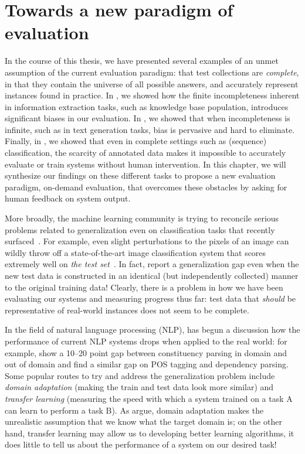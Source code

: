 \chapter[Towards a new paradigm of evaluation]{\label{chap:discussion} Towards a new paradigm of evaluation}

In the course of this thesis, we have presented several examples of an unmet assumption of the current evaluation paradigm: that test collections are \textit{complete}, in that they contain the universe of all possible answers, and accurately represent instances found in practice.
In , we showed how the finite incompleteness inherent in information extraction tasks, such as knowledge base population, introduces significant biases in our evaluation.
In , we showed that when incompleteness is infinite, such as in text generation tasks, bias is pervasive and hard to eliminate.
Finally, in , we showed that even in complete settings such as (sequence) classification, the scarcity of annotated data makes it impossible to accurately evaluate or train systems without human intervention.
In this chapter, we will synthesize our findings on these different tasks to propose a new evaluation paradigm, on-demand evaluation, that overcomes these obstacles by asking for human feedback on system output.

More broadly, the machine learning community is trying to reconcile serious problems related to generalization even on classification tasks that recently surfaced~\citep{}.
For example, even slight perturbations to the pixels of an image can wildly throw off a state-of-the-art image classification system that scores extremely well on \textit{the test set}~\citep{}.
In fact, \citet{} report a generalization gap even when the new test data is constructed in an identical (but independently collected) manner to the original training data!
Clearly, there is a problem in how we have been evaluating our systems and measuring progress thus far:
  test data that \textit{should} be representative of real-world instances does not seem to be complete.

In the field of natural language processing (NLP),
\citet{plank16nonstandard} has begun a discussion how the performance of current NLP systems drops when applied to the real world: 
for example, \citet{mcclosky2010any} show a 10--20 point gap between constituency parsing in domain and out of domain and \citet{foster2011news} find a similar gap on POS tagging and dependency parsing.
Some popular routes to try and address the generalization problem include \textit{domain adaptation} (making the train and test data look more similar) and \textit{transfer learning} (measuring the speed with which a system trained on a task A can learn to perform a task B).
As \citet{plank16nonstandard} argue, domain adaptation makes the unrealistic assumption that we know what the target domain is;
  on the other hand, transfer learning may allow us to developing better learning algorithms, it does little to tell us about the performance of a system on our desired task!

